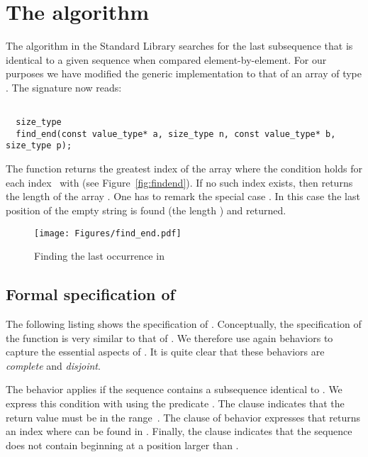 
\section{The \findend algorithm}

The \findend algorithm in the \cxx Standard Library \cite[\S
28.5.6]{cxx-17-draft} searches for the last
subsequence that is identical to a given sequence when 
compared element-by-element.
For our purposes we have modified
the generic implementation
to that of an array of type .
The signature now reads:

\begin{lstlisting}[style = acsl-block]

  size_type
  find_end(const value_type* a, size_type n, const value_type* b, size_type p);
\end{lstlisting}

The function \findend returns the greatest
index  of the array  where the condition  holds for each
index~ with 
(see Figure~\ref{fig:findend}).
If no such index exists, then \findend returns the length
 of the array . One has to remark the special case .
In this case the last position of the empty string is found (the length )
and returned.

\begin{figure}[hbt]
\centering
\texttt{[image: Figures/find\_end.pdf]}
\caption{ Finding the last occurrence  in }
\end{figure}

\clearpage

\subsection{Formal specification of \findend}

The following listing shows the specification of .
Conceptually, the specification of the function \findend is very similar to that of
.
We therefore use again behaviors to capture the essential aspects of \findend.
It is quite clear that these behaviors are \emph{complete} and \emph{disjoint}.

The behavior  applies if the sequence  
contains a subsequence identical to . 
We express this condition with  using the predicate 
.
The  clause  indicates that the return
value must be in the range~.
The clause  of behavior  expresses that \findend
returns an index where  can be found in .
%
Finally, the clause 
indicates that the sequence  does not contain
 beginning at a position larger than \inl{\\result}.

